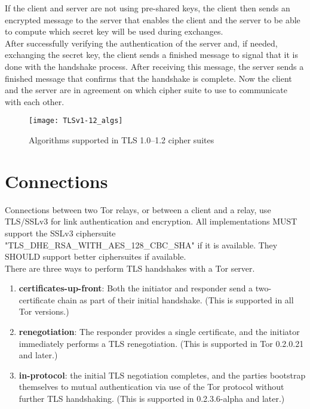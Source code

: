 If the client and server are not using pre-shared keys, the client then sends an encrypted message to the server that enables the client and the server to be able to compute which secret key will be used during exchanges.\cite{ciphersuit-wiki}
\\
After successfully verifying the authentication of the server and, if needed, exchanging the secret key, the client sends a finished message to signal that it is done with the handshake process. After receiving this message, the server sends a finished message that confirms that the handshake is complete. Now the client and the server are in agreement on which cipher suite to use to communicate with each other.\cite{ciphersuit-wiki}


\begin{figure}[!h]
\centering\texttt{[image: TLSv1-12\_algs]}
\caption{Algorithms supported in TLS 1.0–1.2 cipher suites \cite{ciphersuit-wiki}}
\label{fig:TLS_algs} %
\end{figure}

\section{Connections}

Connections between two Tor relays, or between a client and a relay, use TLS/SSLv3 for link authentication and encryption. All implementations MUST support the SSLv3 ciphersuite\\ "TLS\_DHE\_RSA\_WITH\_AES\_128\_CBC\_SHA" if it is available. They SHOULD support better ciphersuites if available.
\\

   There are three ways to perform TLS handshakes with a Tor server. 
   
   \begin{enumerate}
	\itemsep0.5em
   	\item \textbf{certificates-up-front}: Both the initiator and responder send a two-certificate chain as part of their initial handshake.  (This is supported in all Tor versions.)
   	\item \textbf{renegotiation}: The responder provides a single certificate, and the initiator immediately performs a TLS renegotiation. (This is supported in Tor 0.2.0.21 and later.)
   	\item \textbf{in-protocol}: the initial TLS negotiation completes, and the parties bootstrap themselves to mutual authentication via use of the Tor protocol without further TLS handshaking. (This is supported in 0.2.3.6-alpha and later.)
   \end{enumerate}
   
